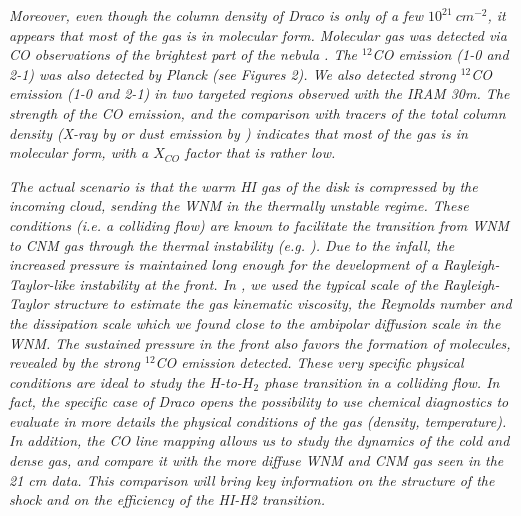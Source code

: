 \documentclass[traditabstract]{aa}
\begin{document}
\textit{   Moreover, even though the column density of Draco is only of a few $10^{21}\: cm^{-2}$, it appears that most of the gas is in molecular form. Molecular gas was detected via CO observations of the brightest part of the nebula \citep{Mebold_1985,Rohlfs_1989}. The $^{12}$CO emission (1-0 and 2-1) was also detected by Planck (see Figures 2). We also detected strong $^{12}$CO emission (1-0 and 2-1) in two targeted regions observed with the IRAM 30m. The strength of the CO emission, and the comparison with tracers of the total column density (X-ray by \citealt{Moritz_1998} or dust emission by \citealt{Herbstmeier_1993,Planck_XXIV_2011}) indicates that most of the gas is in molecular form, with a $X_{CO}$ factor that is rather low.}

\textit{   The actual scenario is that the warm HI gas of the disk is compressed by the incoming cloud, sending the WNM in the thermally unstable regime. These conditions (i.e. a colliding flow) are known to facilitate the transition from WNM to CNM gas through the thermal instability (e.g. \citealt{Saury_2014}). Due to the infall, the increased pressure is maintained long enough for the development of a Rayleigh-Taylor-like instability at the front. In \cite{MAMD_2017b}, we used the typical scale of the Rayleigh-Taylor structure to estimate the gas kinematic viscosity, the Reynolds number and the dissipation scale which we found close to the ambipolar diffusion scale in the WNM.
%
   The sustained pressure in the front also favors the formation of molecules, revealed by the strong $^{12}$CO emission detected. These very specific physical conditions are ideal to study the H-to-$H_2$ phase transition in a colliding flow. In fact, the specific case of Draco opens the possibility to use chemical diagnostics to evaluate in more details the physical conditions of the gas (density, temperature). In addition, the CO line mapping allows us to study the dynamics of the cold and dense gas, and compare it with the more diffuse WNM and CNM gas seen in the 21 cm data. This comparison will bring key information on the structure of the shock and on the efficiency of the HI-H2 transition.}

%
%
\end{document}
